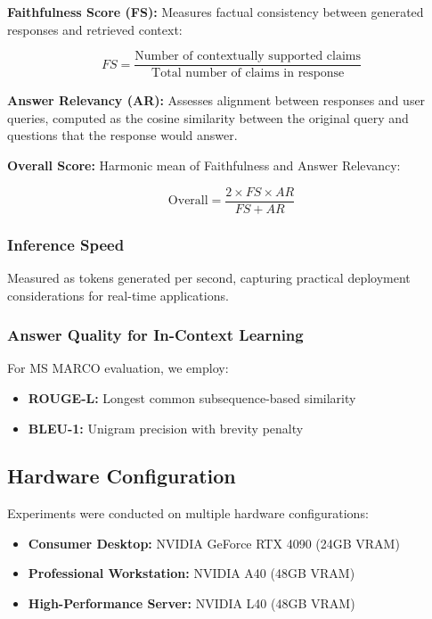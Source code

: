 \textbf{Faithfulness Score (FS):} Measures factual consistency between generated responses and retrieved context:

\begin{equation}
FS = \frac{\text{Number of contextually supported claims}}{\text{Total number of claims in response}}
\end{equation}

\textbf{Answer Relevancy (AR):} Assesses alignment between responses and user queries, computed as the cosine similarity between the original query and questions that the response would answer.

\textbf{Overall Score:} Harmonic mean of Faithfulness and Answer Relevancy:

\begin{equation}
\text{Overall} = \frac{2 \times FS \times AR}{FS + AR}
\end{equation}

\subsubsection{Inference Speed}

Measured as tokens generated per second, capturing practical deployment considerations for real-time applications.

\subsubsection{Answer Quality for In-Context Learning}

For MS MARCO evaluation, we employ:
\begin{itemize}[leftmargin=*]
    \item \textbf{ROUGE-L:} Longest common subsequence-based similarity~\cite{lin2004rouge}
    \item \textbf{BLEU-1:} Unigram precision with brevity penalty~\cite{papineni2002bleu}
\end{itemize}

\subsection{Hardware Configuration}

Experiments were conducted on multiple hardware configurations:

\begin{itemize}[leftmargin=*]
    \item \textbf{Consumer Desktop:} NVIDIA GeForce RTX 4090 (24GB VRAM)
    \item \textbf{Professional Workstation:} NVIDIA A40 (48GB VRAM)
    \item \textbf{High-Performance Server:} NVIDIA L40 (48GB VRAM)
\end{itemize}

